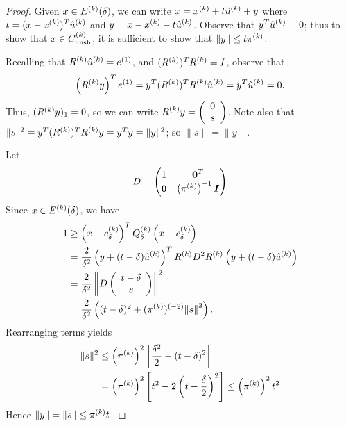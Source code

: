 \documentclass{article}
\begin{document}
\begin{proof}
Given  $x \in {E^{(k)}}(\delta)$,  we can write $x = x^{(k)}+t{{{\hat u}^{(k)}}}+y$ where $t = (x-x^{(k)})^T {{{\hat u}^{(k)}}}$ and $y=x-x^{(k)}-t{{{\hat u}^{(k)}}}$.   Observe that $y^T {{{\hat u}^{(k)}}} = 0$; thus to show that $x \in {C^{(k)}_{\textrm{unsh}}}$,  it is sufficient to show that $\|y\| \le t \pi^{(k)}$.  

Recalling that  ${R^{(k)}} {{{\hat u}^{(k)}}} = {e^{(1)}}$,   and $({R^{(k)}})^T{R^{(k)}}=I$,  observe that
\[ \left({R^{(k)}} y\right)^T{e^{(1)}} = y^T ({R^{(k)}})^T {R^{(k)}} {{{\hat u}^{(k)}}} = y^T{{{\hat u}^{(k)}}} = 0.\]
Thus,  $({R^{(k)}} y)_1=0$,  so we can write 
$\displaystyle {R^{(k)}} y = \left( \begin{array}{cc}0 \\ s \end{array}\right)$.    Note also that
$\|s\|^2 = y^T ({R^{(k)}})^T{R^{(k)}} y = y^T y=\|y\|^2$; so $\|s\|=\|y\|$.

Let
\begin{equation}\label{define_matrix_D}
 D =   \begin{pmatrix}
1 & \boldsymbol0^T \\
\boldsymbol 0 & \left({\pi^{(k)}}\right)^{-1} \boldsymbol I \\
\end{pmatrix} 
\end{equation}
Since $x \in {E^{(k)}}(\delta)$, we have
\begin{align*} 1 & \ge  \left(x-c^{(k)}_{\delta}\right)^T {Q^{(k)}_{\delta}} \left(x-c^{(k)}_{\delta}\right) \\
& = \frac{2}{\delta^2} \left(y+(t-\delta){{{\hat u}^{(k)}}}\right)^T {R^{(k)}} D^2 {R^{(k)}} \left(y+(t -\delta) {{{\hat u}^{(k)}}}\right) \\
& = \frac{2}{\delta^2}\left\| D \left(\begin{array}{c}t-\delta \\ s \end{array} \right) \right\|^2 \\
& = \frac{2}{\delta^2}\left((t-\delta)^2 + (\pi^{(k)})^{(-2)} {\left\|s\right\|}^2\right).
\end{align*}
Rearranging terms yields
\begin{align*}
 \|s\|^2 &\le \left(\pi^{(k)}\right)^2 \left[\frac {\delta^2}{2} - (t - \delta)^2\right] \\
&= \left(\pi^{(k)}\right)^2 \left[t^2 - 2\left(t - \frac {\delta}{2}\right)^2 \right] \le \left(\pi^{(k)}\right)^2t^2
\end{align*}
Hence $\|y\| = \|s\| \le \pi^{(k)} t$.   
\end{proof}
\end{document}
